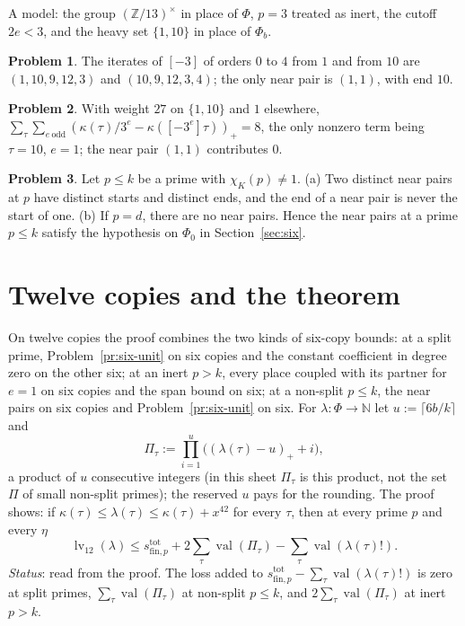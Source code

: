 \documentclass[reqno]{amsart}
\theoremstyle{definition}
\newtheorem{problem}{Problem}[section]
\theoremstyle{plain}
\newcommand{\Z}{\mathbb{Z}}
\newcommand{\N}{\mathbb{N}}
\newcommand{\val}{\operatorname{val}}
\newcommand{\lv}{\operatorname{lv}}
\newcommand{\stot}{s^{\mathrm{tot}}_{\mathrm{fin},p}}
\begin{document}
A model: the group \((\Z/13)^\times\) in place of \(\Phi\), \(p = 3\) treated as inert, the cutoff \(2e < 3\), and the heavy set \(\{1, 10\}\) in place of \(\Phi_b\).

\begin{problem}\label{pr:model-edges}
The iterates of \([-3]\) of orders \(0\) to \(4\) from \(1\) and from \(10\) are \((1, 10, 9, 12, 3)\) and \((10, 9, 12, 3, 4)\); the only near pair is \((1, 1)\), with end \(10\).
\end{problem}

\begin{problem}\label{pr:model-sum}
With weight \(27\) on \(\{1, 10\}\) and \(1\) elsewhere, \(\sum_{\tau}\sum_{e\ \mathrm{odd}} (\kappa(\tau)/3^e - \kappa([-3^e]\tau))_+ = 8\), the only nonzero term being \(\tau = 10\), \(e = 1\); the near pair \((1,1)\) contributes \(0\).
\end{problem}

\begin{problem}\label{pr:near-unique}
Let \(p \le k\) be a prime with \(\chi_K(p) \ne 1\).  (a) Two distinct near pairs at \(p\) have distinct starts and distinct ends, and the end of a near pair is never the start of one.  (b) If \(p = d\), there are no near pairs.  Hence the near pairs at a prime \(p \le k\) satisfy the hypothesis on \(\Phi_0\) in Section~\ref{sec:six}.
\end{problem}

\section{Twelve copies and the theorem}\label{sec:twelve}

On twelve copies the proof combines the two kinds of six-copy bounds: at a split prime, Problem~\ref{pr:six-unit} on six copies and the constant coefficient in degree zero on the other six; at an inert \(p > k\), every place coupled with its partner for \(e = 1\) on six copies and the span bound on six; at a non-split \(p \le k\), the near pairs on six copies and Problem~\ref{pr:six-unit} on six.  For \(\lambda\colon\Phi\to\N\) let \(u := \lceil 6b/k\rceil\) and
\[
  \Pi_\tau := \prod_{i=1}^{u}\bigl((\lambda(\tau) - u)_+ + i\bigr),
\]
a product of \(u\) consecutive integers (in this sheet \(\Pi_\tau\) is this product, not the set \(\Pi\) of small non-split primes); the reserved \(u\) pays for the rounding.  The proof shows: if \(\kappa(\tau) \le \lambda(\tau) \le \kappa(\tau) + x^{42}\) for every \(\tau\), then at every prime \(p\) and every \(\eta\)
\[
  \lv_{12}(\lambda) \le \stot + 2\sum_\tau \val(\Pi_\tau) - \sum_\tau \val(\lambda(\tau)!) .
\]
\emph{Status}: read from the proof.  The loss added to \(\stot - \sum_\tau\val(\lambda(\tau)!)\) is zero at split primes, \(\sum_\tau\val(\Pi_\tau)\) at non-split \(p \le k\), and \(2\sum_\tau\val(\Pi_\tau)\) at inert \(p > k\).
\end{document}
